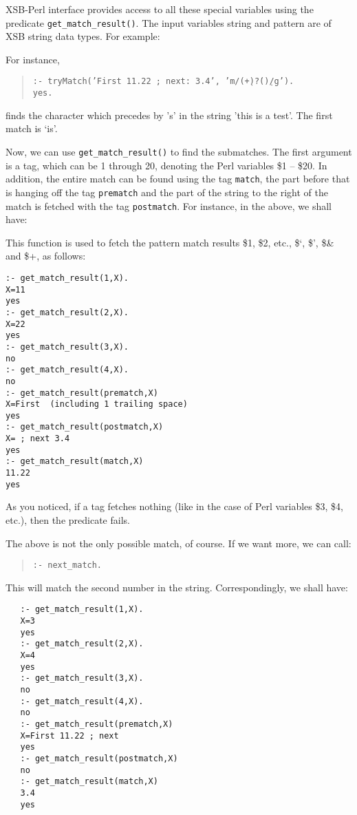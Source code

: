 XSB-Perl interface provides access to all these special variables using the
predicate {\tt get\_match\_result()}.
The input variables string
and pattern are of XSB string data types. For example:

For instance,
\begin{quote}
 {\tt :- tryMatch('First 11.22 ; next: 3.4', 'm/(\d+)\.?(\d*)/g'). }\\
 {\tt yes.}  
\end{quote}
finds the character which precedes by 's' in the string 'this is a
test'. The first match is `is'.

Now, we can use {\tt get\_match\_result()} to find the submatches.  The
first argument is a tag, which can be 1 through 20, denoting the Perl
variables \$1 -- \$20. In addition, the entire match can be found using the
tag {\tt match}, the part before that is hanging off the tag {\tt prematch}
and the part of the string to the right of the match is fetched with the
tag {\tt postmatch}. For instance, in the above, we shall have: 

This function is used to fetch the pattern match results {\$}1, {\$}2, etc.,
{\$}`, {\$}', {\$}{\&} and {\$}+, as follows:

\begin{verbatim}
:- get_match_result(1,X).
X=11
yes
:- get_match_result(2,X).
X=22
yes
:- get_match_result(3,X).
no
:- get_match_result(4,X).
no
:- get_match_result(prematch,X)
X=First  (including 1 trailing space)
yes
:- get_match_result(postmatch,X)
X= ; next 3.4
yes
:- get_match_result(match,X)
11.22
yes
\end{verbatim}

As you noticed, if a tag fetches nothing (like in the case of Perl
variables \$3, \$4, etc.), then the predicate fails.

The above is not the only possible match, of course. If we want more, we
can call:
\begin{quote}
 {\tt  :- next\_match. }
\end{quote}

This will match the second number in the string. Correspondingly, we shall
have: 
\begin{verbatim}
   :- get_match_result(1,X).
   X=3
   yes
   :- get_match_result(2,X).
   X=4
   yes
   :- get_match_result(3,X).
   no
   :- get_match_result(4,X).
   no
   :- get_match_result(prematch,X)
   X=First 11.22 ; next 
   yes
   :- get_match_result(postmatch,X)
   no
   :- get_match_result(match,X)
   3.4
   yes
\end{verbatim}

